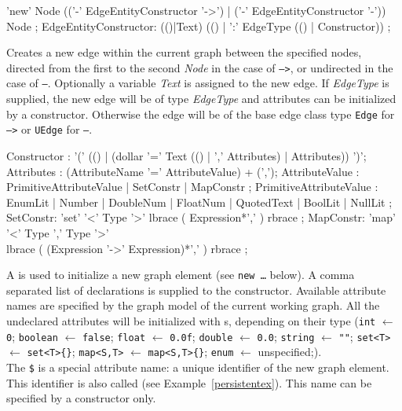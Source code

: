 \begin{rail}
  'new' Node (('-' EdgeEntityConstructor '->') | ('-' EdgeEntityConstructor '-')) Node ;
EdgeEntityConstructor:
  (()|Text) (() | ':' EdgeType (() | Constructor)) ;
\end{rail}
Creates a new edge within the current graph between the specified nodes,
directed from the first to the second \emph{Node} in the case of \texttt{-->},
or undirected in the case of \texttt{--}.
Optionally a variable \emph{Text} is assigned to the new edge.
If \emph{EdgeType} is supplied, the new edge will be of type \emph{EdgeType} and attributes can be initialized by a constructor.
Otherwise the edge will be of the base edge class type \texttt{Edge} for \texttt{-->} or \texttt{UEdge} for \texttt{--}.

\begin{rail}
  Constructor : '(' (() | (dollar '=' Text (() | ',' Attributes) | Attributes)) ')';
  Attributes : (AttributeName '=' AttributeValue) + (',');
  AttributeValue :  PrimitiveAttributeValue | SetConstr | MapConstr ;
  PrimitiveAttributeValue : EnumLit | Number | DoubleNum | FloatNum | QuotedText | BoolLit | NullLit ;
  SetConstr: 'set' '<' Type '>' lbrace ( Expression*',' ) rbrace ;
  MapConstr: 'map' '<' Type ',' Type '>' \\ lbrace ( (Expression '->' Expression)*',' ) rbrace ;
\end{rail}\indexmain{\texttt{\$}}
A  is used to initialize a new graph element (see \texttt{new \dots} below).
A comma separated list of  declarations is supplied to the constructor.
Available attribute names are specified by the graph model of the current working graph.
All the undeclared attributes will be initialized with s, depending on their type 
(\texttt{int} $\leftarrow$ \texttt{0}; \texttt{boolean} $\leftarrow$ \texttt{false}; \texttt{float} $\leftarrow$ \texttt{0.0f}; \texttt{double} $\leftarrow$ \texttt{0.0}; \texttt{string} $\leftarrow$ \texttt{""}; \texttt{set<T>} $\leftarrow$ \texttt{set<T>\{\}}; \texttt{map<S,T>} $\leftarrow$ \texttt{map<S,T>\{\}}; \texttt{enum} $\leftarrow$ unspecified;).\\
The \texttt{\$} is a special attribute name: a unique identifier of the new graph element.
This identifier is also called  (see Example~\ref{persistentex}).
This name can be specified by a constructor only.

